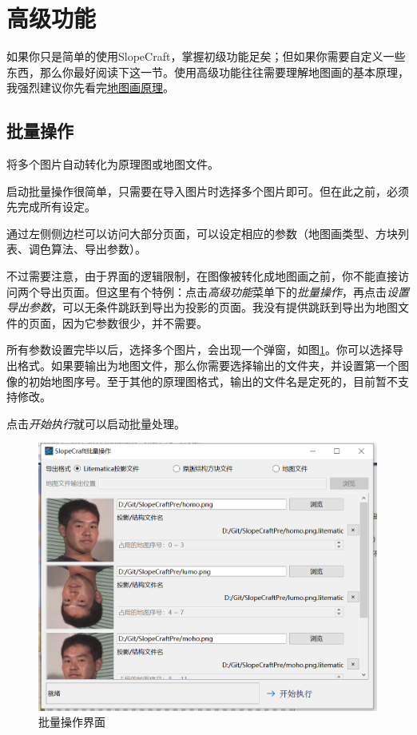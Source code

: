 \documentclass[UTF8]{ctexart}
\begin{document}
   \pagebreak
   \section{高级功能}
   如果你只是简单的使用SlopeCraft，掌握初级功能足矣；但如果你需要自定义一些东西，那么你最好阅读下这一节。使用高级功能往往需要理解地图画的基本原理，我强烈建议你先看完\href{https://github.com/ToKiNoBug/SlopeCraftTutorial/blob/main/BasicPrinciple/Principle%20of%20map%20pixel%20arts.md}{地图画原理}。

   \subsection{批量操作}
   \label{BatchOp}
   将多个图片自动转化为原理图或地图文件。

   启动批量操作很简单，只需要在导入图片时选择多个图片即可。但在此之前，必须先完成所有设定。

   通过左侧侧边栏可以访问大部分页面，可以设定相应的参数（地图画类型、方块列表、调色算法、导出参数）。

   不过需要注意，由于界面的逻辑限制，在图像被转化成地图画之前，你不能直接访问两个导出页面。但这里有个特例：点击\textit{高级功能}菜单下的\textit{批量操作}，再点击\textit{设置导出参数}，可以无条件跳跃到导出为投影的页面。我没有提供跳跃到导出为地图文件的页面，因为它参数很少，并不需要。

   所有参数设置完毕以后，选择多个图片，会出现一个弹窗，如图\ref*{BatchUi}。你可以选择导出格式。如果要输出为地图文件，那么你需要选择输出的文件夹，并设置第一个图像的初始地图序号。至于其他的原理图格式，输出的文件名是定死的，目前暂不支持修改。

   点击\textit{开始执行}就可以启动批量处理。

   \begin{figure}[htbp]
       \centering
       \includegraphics[width=15cm]{Img12_BatchOp.png}
       \caption{批量操作界面}
       \label{BatchUi}
   \end{figure}
\end{document}
